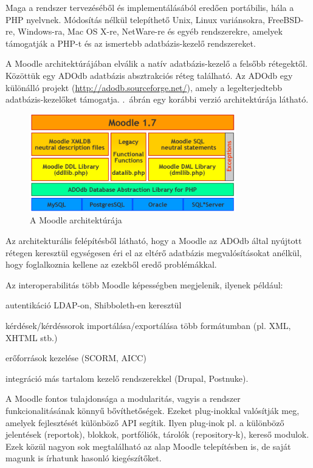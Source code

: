 Maga a rendszer tervezéséből és implementálásából eredően portábilis, hála a PHP nyelvnek. Módosítás nélkül telepíthető Unix, Linux variánsokra, FreeBSD-re, Windows-ra, Mac OS X-re, NetWare-re és egyéb rendszerekre, amelyek támogatják a PHP-t és az ismertebb adatbázis-kezelő rendszereket.

A Moodle architektúrájában elválik a natív adatbázis-kezelő a felsőbb rétegektől. Közöttük egy ADOdb adatbázis absztrakciós réteg található. Az ADOdb egy különálló projekt (\href{http://adodb.sourceforge.net/}{http://adodb.sourceforge.net/}), amely a legelterjedtebb adatbázis-kezelőket támogatja. .~ábrán egy korábbi verzió architektúrája látható.

\begin{figure}[h!]
\centering
\includegraphics[width=0.8\textwidth]{figures/moodlearch.png}
\caption{A Moodle architektúrája \label{fig:moodlearch}}
\end{figure}

Az architekturális felépítésből látható, hogy a Moodle az ADOdb által nyújtott rétegen keresztül egységesen éri el az eltérő adatbázis megvalósításokat anélkül, hogy foglalkoznia kellene az ezekből eredő problémákkal.  

Az interoperabilitás több Moodle képességben megjelenik, ilyenek például:
\begin{sajat_itemize}
\setlength{\itemsep}{0pt}
\item autentikáció LDAP-on, Shibboleth-en keresztül
\item kérdések/kérdéssorok importálása/exportálása több formátumban (pl. XML, XHTML stb.)
\item erőforrások kezelése (SCORM, AICC)
\item integráció más tartalom kezelő rendszerekkel (Drupal, Postnuke).
\end{sajat_itemize}

A Moodle fontos tulajdonsága a modularitás, vagyis a rendszer funkcionalitásának könnyű bővíthetőségek. Ezeket plug-inokkal valósítják meg, amelyek fejlesztését különböző API segítik. Ilyen plug-inok pl. a különböző jelentések (reportok), blokkok, portfóliók, tárolók (repository-k), kereső modulok. Ezek közül nagyon sok megtalálható az alap Moodle telepítésben is, de saját magunk is írhatunk hasonló kiegészítőket.

